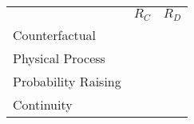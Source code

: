 \documentclass[letterpaper]{article}
\newcommand{\cmark}{\ding{51}}%
\providecommand{\cw}{\hspace{0.08in}}
\begin{document}
 
\begin{table*}
\begin{small}
\begin{tabular}{l@{\cw}c@{\cw}c}
 & $R_C$ & $R_D$\\
Counterfactual   &  \cmark & \cmark  \\  
Physical Process   & \cmark   & \cmark  \\  
Probability Raising &  \cmark  &    \\  
Continuity &    \cmark  &  \\  
\end{tabular}
\end{small}
\end{table*}
\end{document}
